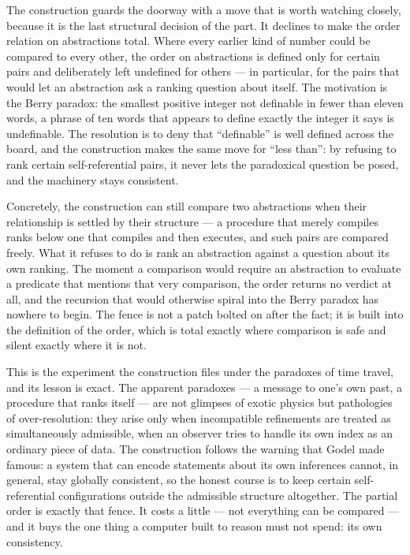 The construction guards the doorway with a move that is worth watching closely, because it is the last
structural decision of the part. It declines to make the order relation on abstractions total. Where
every earlier kind of number could be compared to every other, the order on abstractions is defined
only for certain pairs and deliberately left undefined for others --- in particular, for the pairs that
would let an abstraction ask a ranking question about itself. The motivation is the Berry paradox: the
smallest positive integer not definable in fewer than eleven words, a phrase of ten words that appears
to define exactly the integer it says is undefinable. The resolution is to deny that ``definable'' is
well defined across the board, and the construction makes the same move for ``less than'': by refusing
to rank certain self-referential pairs, it never lets the paradoxical question be posed, and the
machinery stays consistent.

Concretely, the construction can still compare two abstractions when their relationship is settled by
their structure --- a procedure that merely compiles ranks below one that compiles and then executes,
and such pairs are compared freely. What it refuses to do is rank an abstraction against a question
about its own ranking. The moment a comparison would require an abstraction to evaluate a predicate that
mentions that very comparison, the order returns no verdict at all, and the recursion that would
otherwise spiral into the Berry paradox has nowhere to begin. The fence is not a patch bolted on after
the fact; it is built into the definition of the order, which is total exactly where comparison is safe
and silent exactly where it is not.

This is the experiment the construction files under the paradoxes of time travel, and its lesson is
exact. The apparent paradoxes --- a message to one's own past, a procedure that ranks itself --- are
not glimpses of exotic physics but pathologies of over-resolution: they arise only when incompatible
refinements are treated as simultaneously admissible, when an observer tries to handle its own index as
an ordinary piece of data. The construction follows the warning that Godel made famous: a system that
can encode statements about its own inferences cannot, in general, stay globally consistent, so the
honest course is to keep certain self-referential configurations outside the admissible structure
altogether. The partial order is exactly that fence. It costs a little --- not everything can be
compared --- and it buys the one thing a computer built to reason must not spend: its own consistency.

